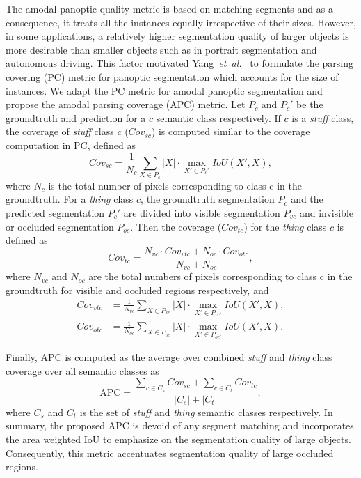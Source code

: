 \documentclass[10pt,twocolumn,letterpaper]{article}
\begin{document}
The amodal panoptic quality metric is based on matching segments and as a consequence, it treats all the instances equally irrespective of their sizes. However, in some applications, a relatively higher segmentation quality of larger objects is more desirable than smaller objects such as in portrait segmentation and autonomous driving. This factor motivated Yang~\textit{et~al.}~\cite{yang2019deeperlab} to formulate the parsing covering (PC) metric for panoptic segmentation which accounts for the size of instances. We adapt the PC metric for amodal panoptic segmentation and propose the amodal parsing coverage (APC) metric. Let $P_c$ and $P_c'$ be the groundtruth and prediction for a $c$ semantic class respectively. If $c$ is a \textit{stuff} class, the coverage of \textit{stuff} class $c$ ($Cov_{sc}$) is computed similar to the coverage computation in PC, defined as
\begin{equation}
    Cov_{sc} = \frac{1}{N_c}\sum_{X\in P_{c}}\left | X \right | \cdot \max_{X'\in P_c'}IoU(X',X),
\end{equation}
where $N_c$ is the total number of pixels corresponding to class c in the groundtruth. For a \textit{thing} class $c$, the groundtruth segmentation $P_c$ and the predicted segmentation $P_c'$ are divided into visible segmentation $P_{vc}$ and invisible or occluded segmentation $P_{oc}$. Then the coverage ($Cov_{tc}$) for the \textit{thing} class $c$ is defined as
\begin{equation}
    Cov_{tc} = \frac{N_{vc} \cdot Cov_{vtc} + N_{oc} \cdot Cov_{otc}}{N_{vc}+N_{oc}},
\end{equation}
where $N_{vc}$ and $N_{oc}$ are the total numbers of pixels corresponding to class c in the groundtruth for visible and occluded regions respectively, and
\begin{align}
    Cov_{vtc} &=  \frac{1}{N_{vc}}\sum_{X\in P_{vc}}\left | X \right | \cdot \max_{X'\in P_{vc'}}IoU(X',X),\\
    Cov_{otc} &=  \frac{1}{N_{oc}}\sum_{X\in P_{oc}}\left | X \right | \cdot \max_{X'\in P_{oc'}}IoU(X',X).
\end{align}

Finally, APC is computed as the average over combined \textit{stuff} and \textit{thing} class coverage over all semantic classes as
\begin{equation}
\text{APC} = \frac{\sum_{c\in C_s}Cov_{sc} + \sum_{c\in C_t}Cov_{tc}}{|C_s|+ |C_t|},
\end{equation}
where $C_s$ and $C_t$ is the set of \textit{stuff} and  \textit{thing} semantic classes respectively. In summary, the proposed APC is devoid of any segment matching and incorporates the area weighted IoU to emphasize on the segmentation quality of large objects. Consequently, this metric accentuates segmentation quality of large occluded regions.
 
\end{document}
